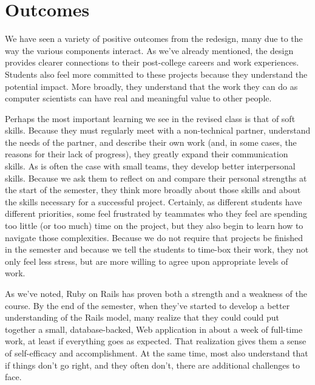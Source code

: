 \section{Outcomes}

We have seen a variety of positive outcomes from the redesign,
many due to the way the various components interact.
As we've already mentioned, the design provides clearer
connections to their post-college careers and work experiences.
Students also feel more committed to these projects
because they understand the potential impact.  More broadly, they
understand that the work they can do as computer scientists can
have real and meaningful value to other people.

Perhaps the most important learning we see in the revised class is
that of soft skills.  Because they must regularly meet with a
non-technical partner, understand the needs of the partner, and
describe their own work (and, in some cases, the reasons for their
lack of progress), they greatly expand their communication skills.
As is often the case with small teams, they develop better interpersonal
skills.  Because we ask them to reflect on and compare their personal
strengths at the start of the semester,
they think more broadly
about those skills and about the skills necessary for a successful
project.  Certainly, as different students have different priorities,
some feel frustrated by teammates who they feel are spending
too little (or too much) time on the project, but they also
begin to learn how to navigate those complexities.  Because we do
not require that projects be finished in the semester and because
we tell the students to time-box their work, they not only feel
less stress, but are more willing to agree upon appropriate levels
of work. 

As we've noted, Ruby on Rails has proven both a strength and a weakness
of the course.  By the end of the semester, when they've started to develop
a better understanding of the Rails model, many realize that they could
could put together a small, database-backed, Web application
in about a week of full-time work, at least if everything goes as
expected.  
That realization gives them a sense of self-efficacy
and accomplishment.  At the same time, most also understand that if things
don't go right, and they often don't, there are additional challenges
to face.

